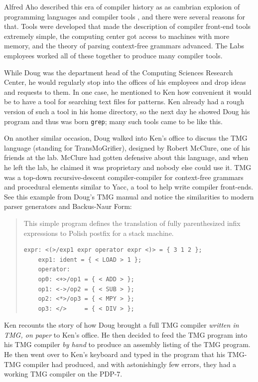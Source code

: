 Alfred Aho described this era of compiler history
as as cambrian explosion of programming languages and compiler tools
\cite{aho_bell_labs_role_in_programming_languages_2025},
and there were several reasons for that.
Tools were developed that made the description of compiler front-end
tools extremely simple, the computing center got access to machines with
more memory, and the theory of parsing context-free grammars advanced.
The Labs employees worked all of these together to produce many compiler
tools.

While Doug was the department head of the Computing Sciences Research Center,
he would regularly stop into the offices of his employees and drop ideas and requests
to them. In one case, he mentioned to Ken how convenient it would be to have
a tool for searching text files for patterns.
Ken already had a rough version of such a tool in his home directory,
so the next day he showed Doug his program and thus was born \texttt{grep};
many such tools came to be like this.

On another similar occasion, Doug walked into Ken's office to discuss the TMG language
(standing for TransMoGrifier),
designed by Robert McClure\cite{mcclure_tmg_compiler_compiler_1965}, one of his friends at the lab.
McClure had gotten defensive about this language, and when he left the lab,
he claimed it was proprietary and nobody else could use it.
TMG was a top-down recursive-descent compiler-compiler for context-free grammars
and procedural elements similar to Yacc, a tool to help write compiler
front-ends.
See this example from Doug's TMG manual\cite{tmg_manual_mcilroy_1972}
and notice the similarities to modern parser generators and Backus-Naur Form:

\begin{quotation}
	This simple program defines the translation of fully parenthesized infix
	expressions to Polish postfix for a stack machine.
	\begin{lstlisting}[frame=single]
    expr: <(>/exp1 expr operator expr <)> = { 3 1 2 };
    exp1: ident = { < LOAD > 1 };
    operator:
    op0: <+>/op1 = { < ADD > };
    op1: <->/op2 = { < SUB > };
    op2: <*>/op3 = { < MPY > };
    op3: </>     = { < DIV > };
\end{lstlisting}
\end{quotation}

Ken recounts\cite{kernighan_interviews_thompson_2019}
the story of how Doug brought a full TMG compiler \textit{written in TMG,
	on paper} to Ken's office. He then decided to feed the TMG program into his TMG compiler
\textit{by hand} to produce an assembly listing of the TMG program.
He then went over to Ken's keyboard and typed in the program that his TMG-TMG compiler
had produced, and with astonishingly few errors, they had a working TMG compiler on the PDP-7.

